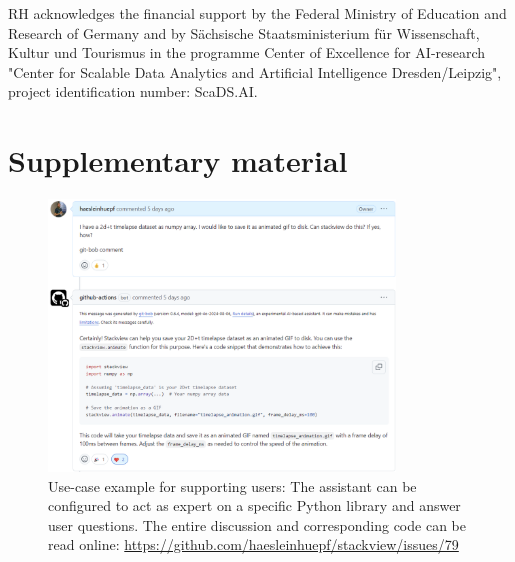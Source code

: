 \documentclass{ecai}
\begin{document}


\begin{ack}
RH acknowledges the financial support by the Federal Ministry of Education and Research of Germany and by Sächsische Staatsministerium für Wissenschaft, Kultur und Tourismus in the programme Center of Excellence for AI-research "Center for Scalable Data Analytics and Artificial Intelligence Dresden/Leipzig", project identification number: ScaDS.AI.

\end{ack}





\section{Supplementary material}
\setcounter{figure}{0} 
\renewcommand{\thefigure}{S\arabic{figure}}




\begin{figure}[h]
\centering
\includegraphics[width=0.82\textwidth]{example_supporting_users.png}
\caption{Use-case example for supporting users: The assistant can be configured to act as expert on a specific Python library and answer user questions. The entire discussion and corresponding code can be read online: \url{https://github.com/haesleinhuepf/stackview/issues/79}
\newline
\newline
}
\label{fig:examplesupportingusers}
\end{figure}
\end{document}
